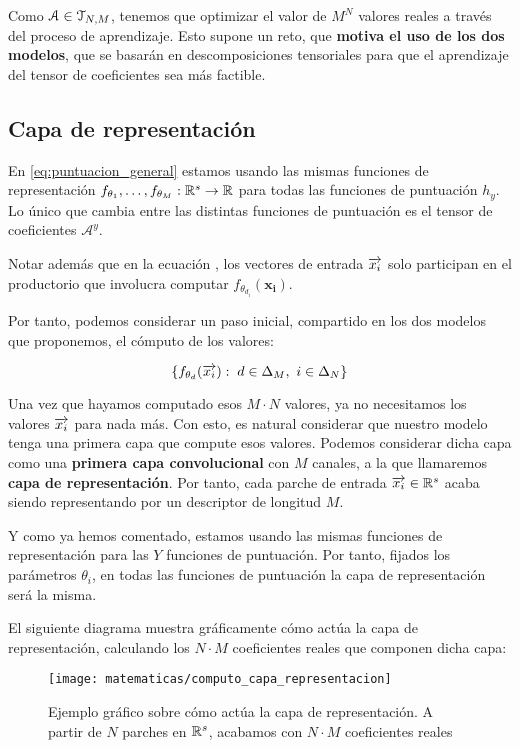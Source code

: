 \begin{observacion}
    Como $\mathcal{A} \in \mathcal{T}_{N, M}$, tenemos que optimizar el valor de $M^N$ valores reales a través del proceso de aprendizaje. Esto supone un reto, que \textbf{motiva el uso de los dos modelos}, que se basarán en descomposiciones tensoriales para que el aprendizaje del tensor de coeficientes sea más factible.
\end{observacion}

\subsection{Capa de representación}

En \eqref{eq:puntuacion_general} estamos usando las mismas funciones de representación $f_{\theta_1}, \ldots, f_{\theta_M}: \mathbb{R}^s \to \mathbb{R}$ para todas las funciones de puntuación $h_y$. Lo único que cambia entre las distintas funciones de puntuación es el tensor de coeficientes $\mathcal{A}^y$.

Notar además que en la ecuación , los vectores de entrada $\overrightarrow{x_i}$ solo participan en el productorio que involucra computar $f_{\theta_{d_i}}(\mathbf{x_i})$.

Por tanto, podemos considerar un paso inicial, compartido en los dos modelos que proponemos, el cómputo de los valores:

$$\{f_{\theta_d}(\overrightarrow{x_i}): \; d \in \Delta_{M},\ i \in \Delta_{N} \}$$

Una vez que hayamos computado esos $M \cdot N$ valores, ya no necesitamos los valores $\overrightarrow{x_i}$ para nada más. Con esto, es natural considerar que nuestro modelo tenga una primera capa que compute esos valores. Podemos considerar dicha capa como una \textbf{primera capa convolucional} con $M$ canales, a la que llamaremos \textbf{capa de representación}. Por tanto, cada parche de entrada $\overrightarrow{x_i} \in \mathbb{R}^s$ acaba siendo representando por un descriptor de longitud $M$.

Y como ya hemos comentado, estamos usando las mismas funciones de representación para las $Y$ funciones de puntuación. Por tanto, fijados los parámetros $\theta_i$, en todas las funciones de puntuación la capa de representación será la misma.

El siguiente diagrama muestra gráficamente cómo actúa la capa de representación, calculando los $N \cdot M$ coeficientes reales que componen dicha capa:

\begin{figure}[H]
    \centering
    \texttt{[image: matematicas/computo\_capa\_representacion]}
    \caption{Ejemplo gráfico sobre cómo actúa la capa de representación. A partir de $N$ parches en $\mathbb{R}^s$, acabamos con $N \cdot M$ coeficientes reales}
\end{figure}


